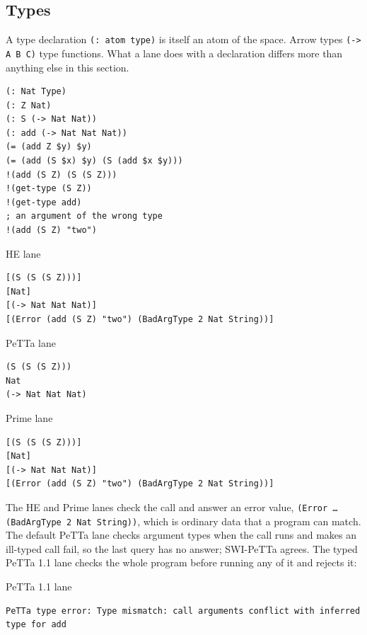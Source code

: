 \documentclass[11pt]{article}
\newcommand{\code}[1]{\texttt{#1}}
\newcommand{\outhead}[1]{{\footnotesize\sffamily #1}\par\vspace{1pt}}
\newcommand{\PeTTa}{\textup{PeTTa}}
\newcommand{\HE}{\textup{HE}}
\begin{document}
\subsection{Types}
\label{sec:tut-types}

A type declaration \code{(: atom type)} is itself an atom of the space.
Arrow types \code{(-> A B C)} type functions.  What a lane does with a
declaration differs more than anything else in this section.

\begin{lstlisting}[style=metta,caption={Declared types and an ill-typed call},label={lst:t05}]
(: Nat Type)
(: Z Nat)
(: S (-> Nat Nat))
(: add (-> Nat Nat Nat))
(= (add Z $y) $y)
(= (add (S $x) $y) (S (add $x $y)))
!(add (S Z) (S (S Z)))
!(get-type (S Z))
!(get-type add)
; an argument of the wrong type
!(add (S Z) "two")
\end{lstlisting}
\noindent\begin{minipage}[t]{0.32\textwidth}
\outhead{HE lane}
\begin{lstlisting}[style=out]
[(S (S (S Z)))]
[Nat]
[(-> Nat Nat Nat)]
[(Error (add (S Z) "two") (BadArgType 2 Nat String))]
\end{lstlisting}
\end{minipage}\hfill
\begin{minipage}[t]{0.32\textwidth}
\outhead{PeTTa lane}
\begin{lstlisting}[style=out]
(S (S (S Z)))
Nat
(-> Nat Nat Nat)
\end{lstlisting}
\end{minipage}\hfill
\begin{minipage}[t]{0.32\textwidth}
\outhead{Prime lane}
\begin{lstlisting}[style=out]
[(S (S (S Z)))]
[Nat]
[(-> Nat Nat Nat)]
[(Error (add (S Z) "two") (BadArgType 2 Nat String))]
\end{lstlisting}
\end{minipage}

\noindent
The \HE{} and Prime lanes check the call and answer an error value,
\code{(Error \ldots (BadArgType 2 Nat String))}, which is ordinary data that a
program can match.  The default \PeTTa{} lane checks argument types when the
call runs and makes an ill-typed call fail, so the last query has no answer;
SWI-\PeTTa{} agrees.  The typed \PeTTa{} 1.1 lane checks the whole program
before running any of it and rejects it:

\noindent\begin{minipage}[t]{0.98\textwidth}
\outhead{PeTTa 1.1 lane}
\begin{lstlisting}[style=out]
PeTTa type error: Type mismatch: call arguments conflict with inferred type for add
\end{lstlisting}
\end{minipage}
\end{document}
